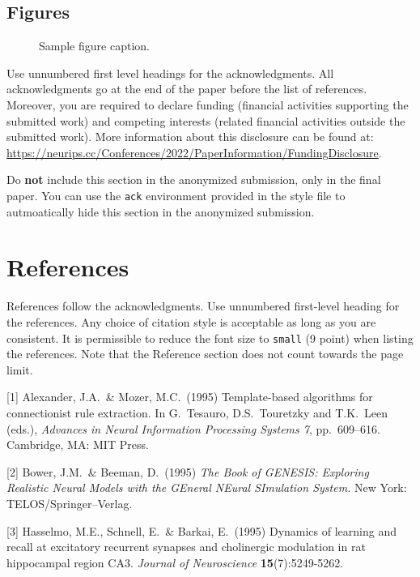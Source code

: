 \documentclass{article}
\begin{document}
\subsection{Figures}

\begin{figure}
  \centering
  \fbox{\rule[-.5cm]{0cm}{4cm} \rule[-.5cm]{4cm}{0cm}}
  \caption{Sample figure caption.}
\end{figure}

\begin{ack}
Use unnumbered first level headings for the acknowledgments. All acknowledgments
go at the end of the paper before the list of references. Moreover, you are required to declare
funding (financial activities supporting the submitted work) and competing interests (related financial activities outside the submitted work).
More information about this disclosure can be found at: \url{https://neurips.cc/Conferences/2022/PaperInformation/FundingDisclosure}.


Do {\bf not} include this section in the anonymized submission, only in the final paper. You can use the \texttt{ack} environment provided in the style file to autmoatically hide this section in the anonymized submission.
\end{ack}


\section*{References}


References follow the acknowledgments. Use unnumbered first-level heading for
the references. Any choice of citation style is acceptable as long as you are
consistent. It is permissible to reduce the font size to \verb+small+ (9 point)
when listing the references.
Note that the Reference section does not count towards the page limit.
\medskip


{
\small


[1] Alexander, J.A.\ \& Mozer, M.C.\ (1995) Template-based algorithms for
connectionist rule extraction. In G.\ Tesauro, D.S.\ Touretzky and T.K.\ Leen
(eds.), {\it Advances in Neural Information Processing Systems 7},
pp.\ 609--616. Cambridge, MA: MIT Press.


[2] Bower, J.M.\ \& Beeman, D.\ (1995) {\it The Book of GENESIS: Exploring
  Realistic Neural Models with the GEneral NEural SImulation System.}  New York:
TELOS/Springer--Verlag.


[3] Hasselmo, M.E., Schnell, E.\ \& Barkai, E.\ (1995) Dynamics of learning and
recall at excitatory recurrent synapses and cholinergic modulation in rat
hippocampal region CA3. {\it Journal of Neuroscience} {\bf 15}(7):5249-5262.
}
\end{document}
